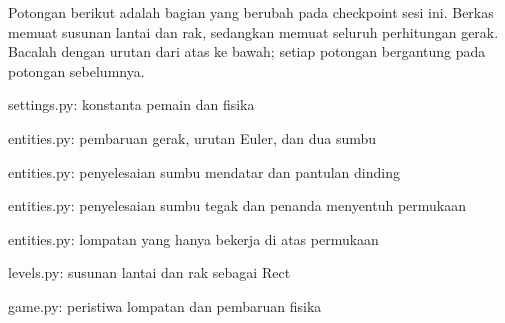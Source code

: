 
Potongan berikut adalah bagian yang berubah pada checkpoint sesi ini. Berkas
 memuat susunan lantai dan rak, sedangkan 
memuat seluruh perhitungan gerak. Bacalah dengan urutan dari atas ke bawah;
setiap potongan bergantung pada potongan sebelumnya.

  {settings.py: konstanta pemain dan fisika}

  {entities.py: pembaruan gerak, urutan Euler, dan dua sumbu}

  {entities.py: penyelesaian sumbu mendatar dan pantulan dinding}

  {entities.py: penyelesaian sumbu tegak dan penanda menyentuh permukaan}

  {entities.py: lompatan yang hanya bekerja di atas permukaan}

  {levels.py: susunan lantai dan rak sebagai Rect}

  {game.py: peristiwa lompatan dan pembaruan fisika}




